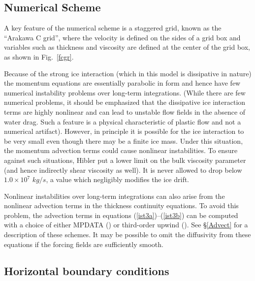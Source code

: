 \subsection{Numerical Scheme}

A key feature of the numerical scheme is a staggered grid, known as
the ``Arakawa C grid'', where the velocity is defined on the sides of a
grid box and variables such as thickness and viscosity are defined
at the center of the grid box, as shown in Fig.\ \ref{fcgr}.

Because of the strong ice interaction (which in this model is
dissipative in nature) the momentum equations are essentially
parabolic in form and hence have few numerical instability problems
over long-term integrations.  (While there are few numerical
problems, it should be emphasized that the dissipative ice
interaction terms are highly nonlinear and can lead to unstable flow
fields in the absence of water drag.  Such a feature is a physical
characteristic of plastic flow and not a numerical artifact).
However, in principle it is possible for the ice interaction to be
very small even though there may be a finite ice mass.  Under this
situation, the momentum advection terms could cause nonlinear
instabilities.  To ensure against such situations, Hibler put a lower
limit on the bulk viscosity parameter
(and hence indirectly shear viscosity as well). It is never
allowed to drop below $1.0 \times 10^7$ $kg/s$, a value which
negligibly modifies the ice drift.

Nonlinear instabilities over long-term integrations can also arise from
the nonlinear advection terms in the thickness continuity equations.
To avoid this problem, the advection terms in equations
(\ref{ist3a})--(\ref{ist3b}) can be computed with a choice of either
MPDATA (\cite{Smolark90}) or third-order upwind
(\cite{Leonard79}). See \S\ref{Advect} for a description of
these schemes. It may be possible to omit the diffusivity from these
equations if the forcing fields are sufficiently smooth.

\subsection{Horizontal boundary conditions}

